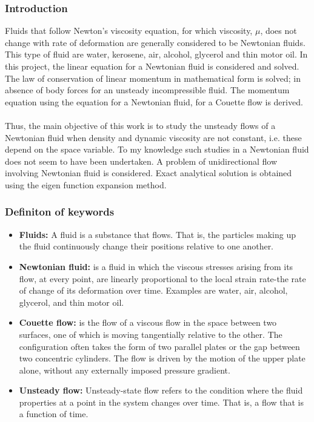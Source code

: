 \documentclass[10pt]{beamer}
\begin{document}
		\begin{frame}
			\frametitle{\textbf{Introduction}}
		Fluids that follow Newton's viscosity equation, for which viscosity, $ \mu $, does not change with rate of deformation are generally considered to be Newtonian fluids. This type of fluid are water, kerosene, air, alcohol, glycerol and thin motor oil. In this project, the linear equation for a Newtonian fluid is considered and solved. The law of conservation of linear momentum in mathematical form is solved; in absence of body forces for an unsteady incompressible fluid. The momentum equation using the equation for a Newtonian fluid, for a Couette flow is derived.\\~\\
		Thus, the main objective of this work is to study the unsteady flows of a Newtonian fluid when density and dynamic viscosity are not constant, i.e. these depend on the space variable. To my knowledge such studies in a Newtonian fluid does not seem to have been undertaken. A problem of unidirectional flow involving Newtonian fluid is considered. Exact analytical solution is obtained using the eigen function expansion method.
		\end{frame}
		\begin{frame}
			\frametitle{\textbf{Definiton of keywords}}
		\begin{itemize}
		\item \textbf{Fluids:} A fluid is a substance that flows. That is, the particles making up the fluid continuously change their positions relative to one another.
		\item \textbf{Newtonian fluid:} is a fluid in which the viscous stresses arising from its flow, at every point, are linearly proportional to the local strain rate-the rate of change of its deformation over time. Examples are water, air, alcohol, glycerol, and thin motor oil.
		\item \textbf{Couette flow:} is the flow of a viscous flow in the space between two surfaces, one of which is moving tangentially relative to the other. The configuration often takes the form of two parallel plates or the gap between two concentric cylinders. The flow is driven by the motion of the upper plate alone, without any externally imposed pressure gradient.
		\item \textbf{Unsteady flow:} Unsteady-state flow refers to the condition where the fluid properties at a point in the system changes over time. That is, a flow that is a function of time.
		
		\end{itemize}
			
		\end{frame}
		
\end{document}

